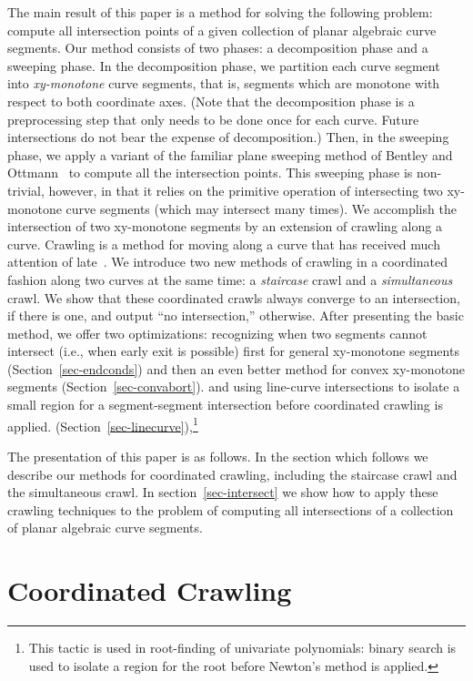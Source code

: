 The main result of this paper is a method for solving the following problem:
compute all intersection points of 
a given collection of planar algebraic curve segments.
Our method consists of two phases: a decomposition phase and a 
sweeping phase.
In the decomposition phase, we partition each curve segment into
{\it xy-monotone} curve segments, that is, segments which are monotone with
respect to both coordinate axes.
(Note that the decomposition phase is a preprocessing step that only needs
to be done once for each curve. Future intersections do not bear the
expense of decomposition.)
Then, in the sweeping phase, we apply a variant of the familiar plane
sweeping method of Bentley and Ottmann~\cite{BeO79} to compute all the
intersection points.
This sweeping phase is non-trivial, however, in that it relies on the
primitive operation of intersecting two xy-monotone curve segments
(which may intersect many times).
We accomplish the intersection of two xy-monotone segments by an extension
of crawling along a curve.
Crawling is a method for moving along a curve that has received
much attention of late~\cite{dtw,hl,or,bhh,h}.
We introduce two new methods of crawling in a coordinated fashion
along two curves at the same time:
a {\it staircase} crawl 
and a {\it simultaneous} crawl.
We show that
these coordinated crawls always converge to an intersection, if there is
one, and output ``no intersection,'' otherwise.
After presenting the basic method, we offer two optimizations:
recognizing when two segments cannot intersect (i.e., when early exit is
possible)
\ifFull first for general xy-monotone segments (Section~\ref{sec-endconds}) 
and then an even better method for convex xy-monotone 
segments (Section~\ref{sec-convabort}).\fi
and using line-curve intersections to isolate a small region for a
segment-segment intersection before coordinated crawling is 
applied.
\ifFull(Section~\ref{sec-linecurve}),\footnote{This tactic 
	is used in root-finding of univariate polynomials:
	binary search is used to isolate a region for the root
	before Newton's method is applied.}\fi

The presentation of this paper is as follows.
In the section which follows we describe our methods for coordinated
crawling, including the staircase crawl and the simultaneous crawl.
In section~\ref{sec-intersect} we show how to apply these crawling
techniques to the problem of computing all intersections of a collection
of planar algebraic curve segments.

\section{Coordinated Crawling}

